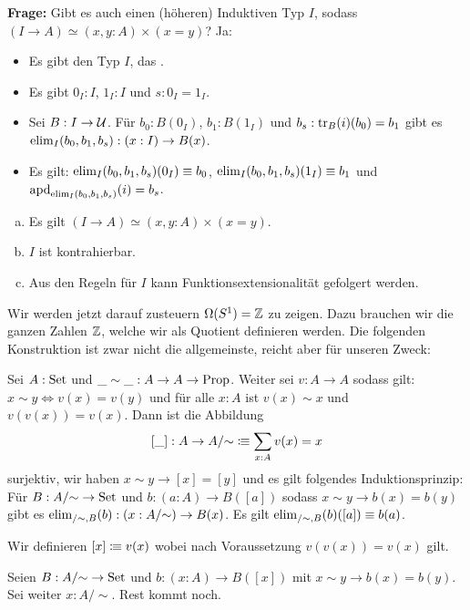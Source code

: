 \textbf{Frage: } Gibt es auch einen (höheren) Induktiven Typ $I$, sodass $(I\to A)\simeq (x,y:A) \times (x=y)$? Ja:

\begin{regeln}
  \begin{itemize}
  \item Es gibt den Typ $I$, das .
  \item Es gibt $0_I:I$, $1_I:I$ und $s:0_I=1_I$.
  \item Sei $B:I\to \mathcal{U}$. Für $b_0:B(0_I)$, $b_1:B(1_I)$ und $b_s:\mathrm{tr}_B(i)(b_0)=b_1$
    gibt es $\mathrm{elim}_I(b_0,b_1,b_s):(x:I)\to B(x)$.
  \item Es gilt: $\mathrm{elim}_I(b_0,b_1,b_s)(0_I)\equiv b_0$, $\mathrm{elim}_I(b_0,b_1,b_s)(1_I)\equiv b_1$ und
    $\mathrm{apd}_{\mathrm{elim}_I(b_0,b_1,b_s)}(i)=b_s$.
  \end{itemize}
\end{regeln}

\begin{bemerkung}
  \begin{enumerate}[(a)]
  \item Es gilt $(I\to A)\simeq (x,y:A) \times (x=y)$.
  \item $I$ ist kontrahierbar.
  \item Aus den Regeln für $I$ kann Funktionsextensionalität gefolgert werden.
  \end{enumerate}
\end{bemerkung}

Wir werden jetzt darauf zusteuern $\Omega(S^1)=\mathbb{Z}$ zu zeigen.
Dazu brauchen wir die ganzen Zahlen $\mathbb{Z}$, welche wir als Quotient definieren werden.
Die folgenden Konstruktion ist zwar nicht die allgemeinste, reicht aber für unseren Zweck:

\begin{lemma}
  Sei $A:\mathrm{Set}$ und $\_\sim\_:A\to A\to \mathrm{Prop}$.
  Weiter sei $v:A\to A$ sodass gilt: $x\sim y\Leftrightarrow v(x)=v(y)$ und für alle $x:A$ ist $v(x)\sim x$ und $v(v(x))=v(x)$.
  Dann ist die Abbildung
  \[
    [\_]:A\to A/{\sim} \vcentcolon\mspace{-1.2mu}\equiv \sum_{x:A}v(x)=x
    \]
    surjektiv, wir haben $x\sim y\to [x]=[y]$ und es gilt folgendes Induktionsprinzip: Für $B:A/{\sim}\to \mathrm{Set}$ und $b:(a:A)\to B([a])$ sodass $x\sim y \to b(x)=b(y)$ gibt es $\mathrm{elim}_{/{\sim},B}(b):(x:A/{\sim} )\to B(x)$.
    Es gilt $\mathrm{elim}_{/{\sim},B}(b)([a])\equiv b(a)$.
\end{lemma}

\begin{beweis}
  Wir definieren $[x]\vcentcolon\mspace{-1.2mu}\equiv v(x)$ wobei nach Voraussetzung $v(v(x))=v(x)$ gilt.

  Seien $B:A/{\sim} \to \mathrm{Set}$ und $b:(x:A)\to B([x])$ mit $x\sim y \to b(x)=b(y)$.
  Sei weiter $x:A/{\sim}$. Rest kommt noch.
\end{beweis}

